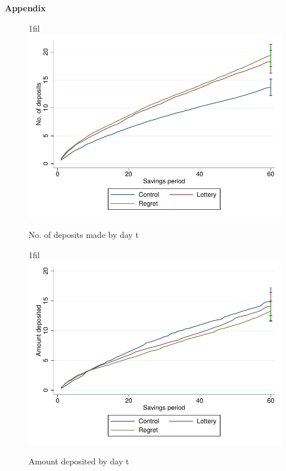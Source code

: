 \documentclass[10pt]{article}
\makeatletter
\newcommand*{\centerfloat}{\parindent \z@ \leftskip \z@ \@plus 1fil \@minus \textwidth \rightskip \leftskip \parfillskip \z@skip}
\makeatother
\begin{document}



\newpage

\textbf{Appendix}

	
	
	
	
	
	
	
	

	\clearpage

	\begin{figure}[!htb]
		\centering
		\caption{No. of deposits made by day t}
		\centerfloat
		\includegraphics{../../figures/line-cumdeposits.pdf}
		\label{fig:line-cumdeposits}
	\end{figure}

	\begin{figure}[!htb]
		\centering
		\caption{Amount deposited by day t}
		\centerfloat
		\includegraphics{../../figures/line-cumdepositamount.pdf}
		\label{fig:line-cumdepositamount}
	\end{figure}
\end{document}
